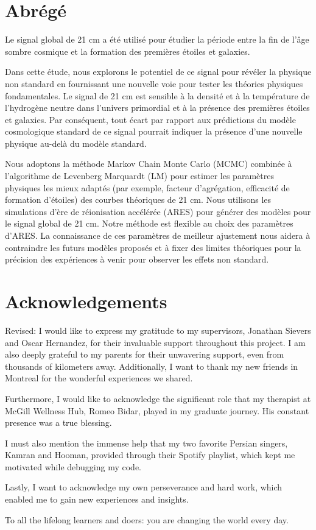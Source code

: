 \documentclass[12pt, TexShade, letterpaper]{report}
\begin{document}
\chapter*{Abrégé}
	\label{chap:frAbstract}
Le signal global de 21 cm a été utilisé pour étudier la période entre la fin de l'âge sombre cosmique et la formation des premières étoiles et galaxies. \par
Dans cette étude, nous explorons le potentiel de ce signal pour révéler la physique non standard en fournissant une nouvelle voie pour tester les théories physiques fondamentales. Le signal de 21 cm est sensible à la densité et à la température de l'hydrogène neutre dans l'univers primordial et à la présence des premières étoiles et galaxies. Par conséquent, tout écart par rapport aux prédictions du modèle cosmologique standard de ce signal pourrait indiquer la présence d'une nouvelle physique au-delà du modèle standard.\par
Nous adoptons la méthode Markov Chain Monte Carlo (MCMC) combinée à l'algorithme de Levenberg Marquardt (LM) pour estimer les paramètres physiques les mieux adaptés (par exemple, facteur d'agrégation, efficacité de formation d'étoiles) des courbes théoriques de 21 cm. Nous utilisons les simulations d'ère de réionisation accélérée (ARES) pour générer des modèles pour le signal global de 21 cm. Notre méthode est flexible au choix des paramètres d'ARES.
La connaissance de ces paramètres de meilleur ajustement nous aidera à contraindre les futurs modèles proposés et à fixer des limites théoriques pour la précision des expériences à venir pour observer les effets non standard.\par
\chapter*{Acknowledgements}
	\label{chap:acknowledgments}


Revised: 
I would like to express my gratitude to my supervisors, Jonathan Sievers and Oscar Hernandez, for their invaluable support throughout this project. I am also deeply grateful to my parents for their unwavering support, even from thousands of kilometers away. Additionally, I want to thank my new friends in Montreal for the wonderful experiences we shared.\par
Furthermore, I would like to acknowledge the significant role that my therapist at McGill Wellness Hub, Romeo Bidar, played in my graduate journey. His constant presence was a true blessing.\par
I must also mention the immense help that my two favorite Persian singers, Kamran and Hooman, provided through their Spotify playlist, which kept me motivated while debugging my code.\par
Lastly, I want to acknowledge my own perseverance and hard work, which enabled me to gain new experiences and insights.\par
 To all the lifelong learners and doers: you are changing the world every day.
	\tableofcontents\thispagestyle{plain}
\end{document}
